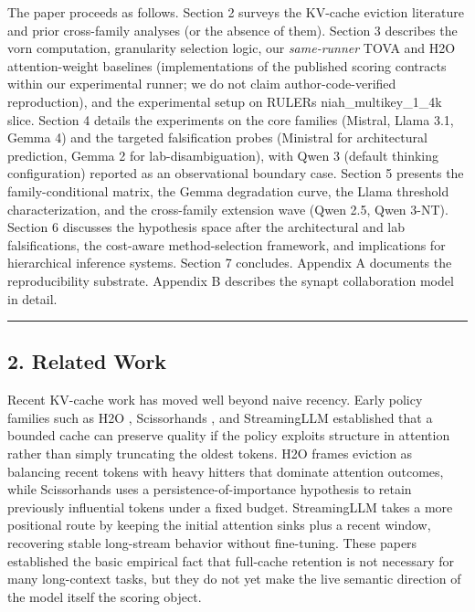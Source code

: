 \documentclass[
]{article}
\begin{document}
The paper proceeds as follows. Section 2 surveys the KV-cache eviction
literature and prior cross-family analyses (or the absence of them).
Section 3 describes the vorn computation, granularity selection logic,
our \emph{same-runner} TOVA and H2O attention-weight baselines
(implementations of the published scoring contracts within our
experimental runner; we do not claim author-code-verified
reproduction), and the experimental setup on RULER\textquotesingle s
niah\_multikey\_1\_4k slice. Section 4 details the experiments on the core families
(Mistral, Llama 3.1, Gemma 4) and the targeted falsification probes
(Ministral for architectural prediction, Gemma 2 for lab-disambiguation),
with Qwen 3 (default thinking configuration) reported as an
observational boundary case. Section 5 presents the family-conditional
matrix, the Gemma degradation curve, the Llama threshold
characterization, and the cross-family extension wave (Qwen 2.5,
Qwen 3-NT). Section 6 discusses the
hypothesis space after the architectural and lab falsifications, the
cost-aware method-selection framework, and implications for hierarchical
inference systems. Section 7 concludes. Appendix A documents the
reproducibility substrate. Appendix B describes the synapt collaboration
model in detail.

\begin{center}\rule{0.5\linewidth}{0.5pt}\end{center}

\subsection{2. Related Work}\label{2-related-work}

Recent KV-cache work has moved well beyond naive recency. Early policy
families such as H2O \citep{zhang2023h2o}, Scissorhands
\citep{liu2023scissorhands}, and StreamingLLM
\citep{xiao2023streamingllm} established that a bounded
cache can preserve quality if the policy exploits structure in attention
rather than simply truncating the oldest tokens. H2O frames eviction as
balancing recent tokens with heavy hitters that dominate attention
outcomes, while Scissorhands uses a persistence-of-importance hypothesis
to retain previously influential tokens under a fixed budget.
StreamingLLM takes a more positional route by keeping the initial
attention sinks plus a recent window, recovering stable long-stream
behavior without fine-tuning. These papers established the basic
empirical fact that full-cache retention is not necessary for many
long-context tasks, but they do not yet make the live semantic direction
of the model itself the scoring object.
\end{document}
